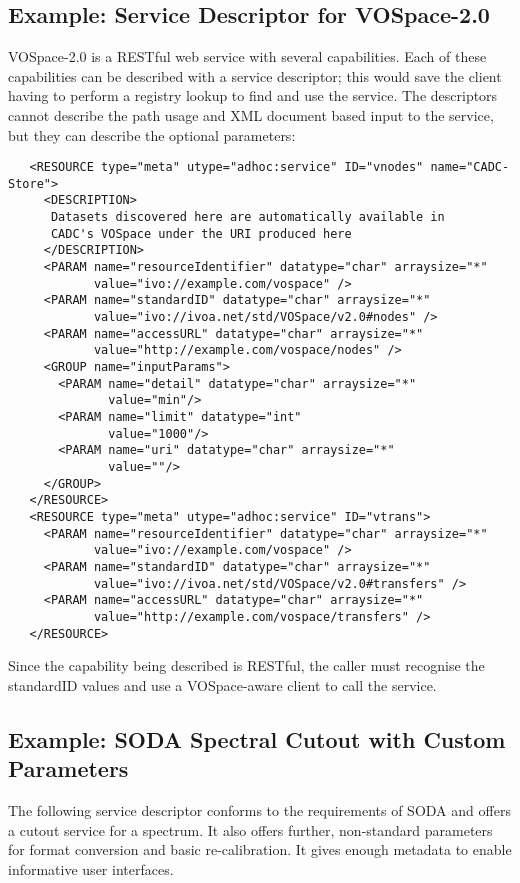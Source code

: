 \documentclass[11pt,a4paper]{ivoa}
\begin{document}
\subsection{Example: Service Descriptor for VOSpace-2.0}

VOSpace-2.0 is a RESTful web service with several capabilities. Each of
these capabilities can be described with a service descriptor; this would
save the client having to perform a registry lookup to find and use the
service. The descriptors cannot describe the path usage and XML document
based input to the service, but they can describe the optional parameters:
\begin{verbatim}
   <RESOURCE type="meta" utype="adhoc:service" ID="vnodes" name="CADC-Store">
     <DESCRIPTION>
      Datasets discovered here are automatically available in 
      CADC's VOSpace under the URI produced here
     </DESCRIPTION>
     <PARAM name="resourceIdentifier" datatype="char" arraysize="*"
            value="ivo://example.com/vospace" />
     <PARAM name="standardID" datatype="char" arraysize="*"
            value="ivo://ivoa.net/std/VOSpace/v2.0#nodes" />
     <PARAM name="accessURL" datatype="char" arraysize="*"
            value="http://example.com/vospace/nodes" />
     <GROUP name="inputParams">
       <PARAM name="detail" datatype="char" arraysize="*"
              value="min"/>
       <PARAM name="limit" datatype="int"
              value="1000"/>
       <PARAM name="uri" datatype="char" arraysize="*"
              value=""/>
     </GROUP>
   </RESOURCE>
   <RESOURCE type="meta" utype="adhoc:service" ID="vtrans">
     <PARAM name="resourceIdentifier" datatype="char" arraysize="*"
            value="ivo://example.com/vospace" />
     <PARAM name="standardID" datatype="char" arraysize="*"
            value="ivo://ivoa.net/std/VOSpace/v2.0#transfers" />
     <PARAM name="accessURL" datatype="char" arraysize="*"
            value="http://example.com/vospace/transfers" />
   </RESOURCE>
\end{verbatim}
Since the capability being described is RESTful, the
caller must recognise the standardID values and use a VOSpace-aware
client to call the service.


\subsection{Example: SODA Spectral Cutout with Custom Parameters}

The following service descriptor conforms to the requirements of SODA
\citep{2017ivoa.spec.0517B} and offers a cutout service for a spectrum.
It also offers further, non-standard parameters for format conversion
and basic re-calibration.  It gives enough metadata to enable
informative user interfaces.
\end{document}
